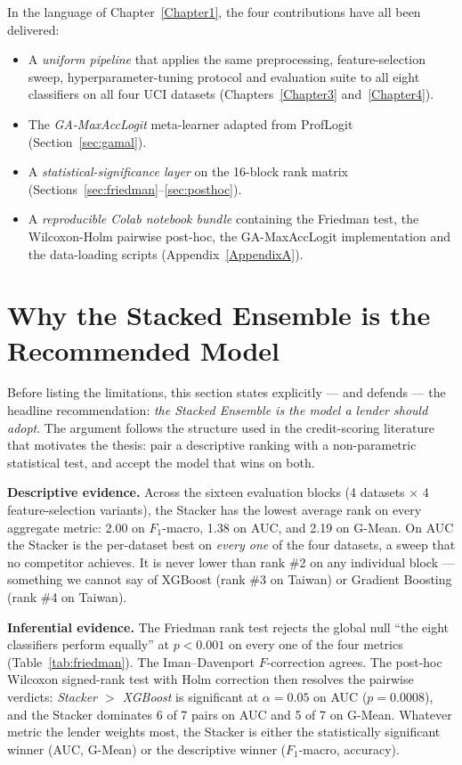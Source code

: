 In the language of Chapter~\ref{Chapter1}, the four contributions
have all been delivered:
\begin{itemize}
 \item A \emph{uniform pipeline} that applies the same
 preprocessing, feature-selection sweep, hyperparameter-tuning
 protocol and evaluation suite to all eight classifiers on all
 four UCI datasets (Chapters~\ref{Chapter3} and~\ref{Chapter4}).
 \item The \emph{GA-MaxAccLogit} meta-learner adapted from
 ProfLogit (Section~\ref{sec:gamal}).
 \item A \emph{statistical-significance layer} on the 16-block
 rank matrix (Sections~\ref{sec:friedman}--\ref{sec:posthoc}).
 \item A \emph{reproducible Colab notebook bundle} containing
 the Friedman test, the Wilcoxon-Holm pairwise post-hoc, the
 GA-MaxAccLogit implementation and the data-loading scripts
 (Appendix~\ref{AppendixA}).
\end{itemize}

\section{Why the Stacked Ensemble is the Recommended Model}
\label{sec:why-stacker}

Before listing the limitations, this section states explicitly ---
and defends --- the headline recommendation: \emph{the Stacked
Ensemble is the model a lender should adopt}.  The argument follows
the structure used in the credit-scoring literature that motivates
the thesis: pair a descriptive ranking with a non-parametric
statistical test, and accept the model that wins on both.

\textbf{Descriptive evidence.}  Across the sixteen evaluation
blocks (4 datasets $\times$ 4 feature-selection variants), the
Stacker has the lowest average rank on every aggregate metric:
2.00 on $F_1$-macro, 1.38 on AUC, and 2.19 on G-Mean.  On AUC the
Stacker is the per-dataset best on \emph{every one} of the four
datasets, a sweep that no competitor achieves.  It is never lower
than rank \#2 on any individual block --- something we cannot say
of XGBoost (rank \#3 on Taiwan) or Gradient Boosting (rank \#4 on
Taiwan).

\textbf{Inferential evidence.}  The Friedman rank test rejects the
global null ``the eight classifiers perform equally'' at $p<0.001$
on every one of the four metrics (Table~\ref{tab:friedman}).  The
Iman--Davenport $F$-correction agrees.  The post-hoc Wilcoxon
signed-rank test with Holm correction then resolves the pairwise
verdicts: \emph{Stacker $>$ XGBoost} is significant at
$\alpha=0.05$ on AUC ($p=0.0008$), and the Stacker dominates 6 of
7 pairs on AUC and 5 of 7 on G-Mean.  Whatever metric the lender
weights most, the Stacker is either the statistically significant
winner (AUC, G-Mean) or the descriptive winner ($F_1$-macro,
accuracy).

